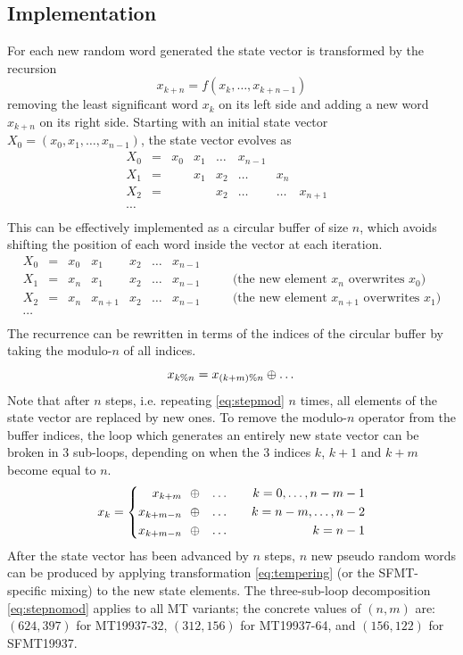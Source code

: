 \documentclass[preprint,1p,times]{elsarticle}
\begin{document}
\subsection{Implementation}
For each new random word generated the state vector is transformed by the recursion $$x_{k+n} = f(x_k, \dots, x_{k+n-1})$$ removing the least significant word $x_{k}$ on its left side and adding a new word $x_{k+n}$ on its right side.
Starting with an initial state vector $X_0=(x_0, x_1, \dots, x_{n-1})$, the state vector evolves as
$$
\begin{matrix}
X_0 &=& x_0 & x_1 & \dots & x_{n-1} &\\
X_1 &=& & x_1 & x_2 & \dots & x_{n} & \\
X_2 &=& & & x_2 & \dots & \dots & x_{n+1} &\\
\cdots \\
\end{matrix}
$$
This can be effectively implemented as a circular buffer of size $n$, which avoids shifting the position of each word inside the vector at each iteration.
\begin{equation}
\label{eq:staterec}
\begin{array}{ccccccccl}
X_0 &=& x_0 & x_1 & x_2 & \dots & x_{n-1} \\
X_1 &=& x_{n} & x_1 & x_2 & \dots & x_{n-1} & \quad&\text{(the new element $x_n$ overwrites $x_0$)} \\
X_2 &=& x_{n} & x_{n+1} & x_2 & \dots & x_{n-1} & \quad&\text{(the new element $x_{n+1}$ overwrites $x_1$)}\\
\cdots \\
\end{array}
\end{equation}
The recurrence can be rewritten in terms of the indices of the circular buffer by taking the modulo-$n$ of all indices.
\begin{equation}
\label{eq:stepmod}
x_{k\%n} = x_{(k+m)\% n} \mathbin{\oplus} \dots
\end{equation}
Note that after $n$ steps, i.e. repeating \eqref{eq:stepmod} $n$ times, all elements of the state vector are replaced by new ones. To remove the modulo-$n$ operator from the buffer indices, the loop which generates an entirely new state vector can be broken in 3 sub-loops, depending on when the 3 indices $k$, $k+1$ and $k+m$ become equal to $n$.
\begin{equation}
\label{eq:stepnomod}
	x_k = \left\{
		\begin{aligned}
			x_{k+m}   & ~~\mathbin{\oplus} & \dots &\quad &k = 0, \dots, n-m-1\\
			x_{k+m-n} & ~~\mathbin{\oplus} & \dots &\quad &k = n-m, \dots, n-2 \\
			x_{k+m-n} & ~~\mathbin{\oplus} & \dots &\quad &k = n-1
		\end{aligned}
    \right.
\end{equation}
After the state vector has been advanced by $n$ steps, $n$ new pseudo random words can be produced by applying transformation \eqref{eq:tempering} (or the SFMT-specific mixing) to the new state elements.
The three-sub-loop decomposition \eqref{eq:stepnomod} applies to all MT variants; the concrete values of $(n,m)$ are: $(624, 397)$ for MT19937-32, $(312, 156)$ for MT19937-64, and $(156, 122)$ for SFMT19937.
\end{document}
